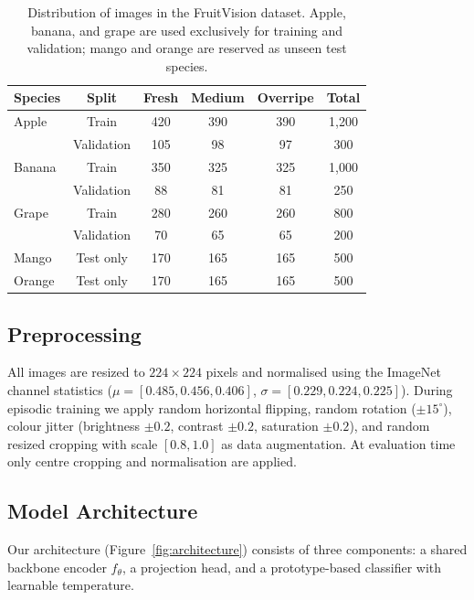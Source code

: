 \documentclass[preprint,12pt,authoryear]{elsarticle}
\begin{document}
\begin{table}[h]
\centering
\caption{Distribution of images in the FruitVision dataset. Apple, banana, and grape
  are used exclusively for training and validation; mango and orange are reserved as
  unseen test species.}
\label{tab:dataset_distribution}
\begin{tabular}{lccccc}
\toprule
\textbf{Species} & \textbf{Split} & \textbf{Fresh} & \textbf{Medium} &
  \textbf{Overripe} & \textbf{Total} \\
\midrule
Apple  & Train      & 420 & 390 & 390 & 1{,}200 \\
       & Validation & 105 &  98 &  97 &   300 \\
Banana & Train      & 350 & 325 & 325 & 1{,}000 \\
       & Validation &  88 &  81 &  81 &   250 \\
Grape  & Train      & 280 & 260 & 260 &   800 \\
       & Validation &  70 &  65 &  65 &   200 \\
\midrule
Mango  & Test only  & 170 & 165 & 165 &   500 \\
Orange & Test only  & 170 & 165 & 165 &   500 \\
\bottomrule
\end{tabular}
\end{table}

\subsection{Preprocessing}

All images are resized to $224 \times 224$ pixels and normalised using the ImageNet
channel statistics ($\mu = [0.485, 0.456, 0.406]$, $\sigma = [0.229, 0.224, 0.225]$).
During episodic training we apply random horizontal flipping, random rotation
($\pm 15^{\circ}$), colour jitter (brightness $\pm 0.2$, contrast $\pm 0.2$,
saturation $\pm 0.2$), and random resized cropping with scale $[0.8, 1.0]$ as data
augmentation. At evaluation time only centre cropping and normalisation are applied.

\subsection{Model Architecture}

Our architecture (Figure~\ref{fig:architecture}) consists of three components:
a shared backbone encoder $f_\theta$, a projection head, and a prototype-based
classifier with learnable temperature.
\end{document}
